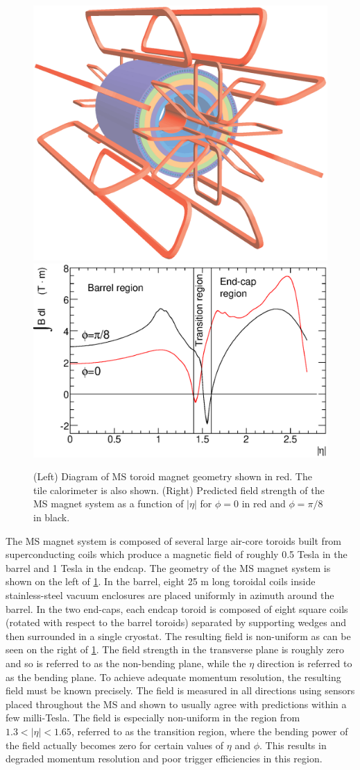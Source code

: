 \begin{figure}[ht]
\centering
\includegraphics[width=.45\textwidth]{figures/atlas/magnet}
\includegraphics[width=.45\textwidth]{figures/atlas/toroid_magnet_field}
\caption{(Left) Diagram of MS toroid magnet geometry shown in red. The
tile calorimeter is also shown.
(Right) Predicted field strength of the MS magnet 
system as a function of $|\eta|$
for $\phi=0$ in red  and $\phi=\pi/8$ in black.}
\label{fig:atlas_toroid_magnet}
\end{figure}


The MS magnet system is composed of several large air-core toroids built
from superconducting coils which produce a magnetic field of 
roughly 0.5 Tesla in the barrel and 1 Tesla in the endcap. 
The geometry of the MS magnet system is shown 
on the left of \fig\ref{fig:atlas_toroid_magnet}. In the barrel, 
eight 25 m long toroidal 
coils inside stainless-steel vacuum enclosures are placed uniformly in 
azimuth around the barrel. In the two end-caps, 
each endcap toroid is composed of 
eight square coils (rotated with respect to the barrel toroids)
separated by supporting wedges and then surrounded in a single 
cryostat.
The resulting field is non-uniform as can be seen on the right
of \fig\ref{fig:atlas_toroid_magnet}. 
The field strength in the transverse plane is roughly zero and so is referred
to as the non-bending plane, while the $\eta$ direction is referred to as the
bending plane.
To achieve adequate momentum resolution, the resulting field must be known
precisely.
The field is measured in all directions using sensors placed throughout
the MS and shown to usually agree with predictions within a few milli-Tesla.
The field is especially non-uniform in the region from 
$1.3 < |\eta| < 1.65$, referred to as the transition region, 
where the bending power of the field actually becomes zero
for certain values of $\eta$ and $\phi$.
This results in degraded momentum resolution and poor trigger efficiencies
in this region.


